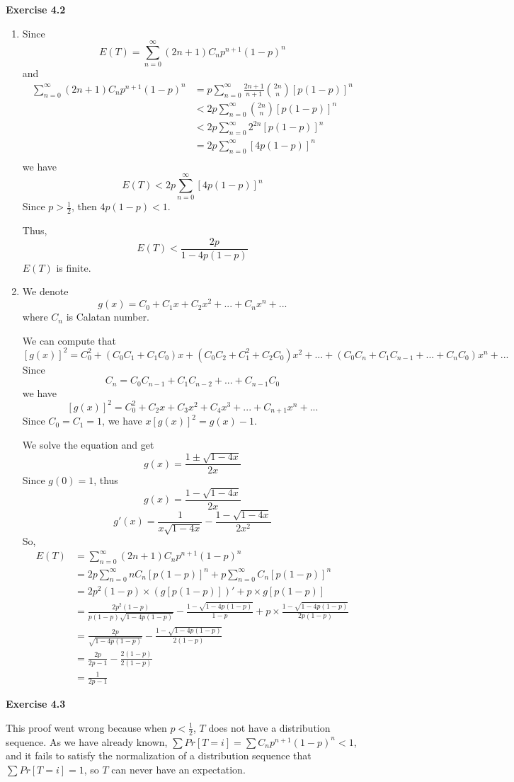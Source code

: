 \documentclass{article} %
\begin{document}
	\textbf{Exercise 4.2}\par
	\begin{enumerate}
	\item Since $$E(T)=\sum_{n=0}^\infty (2n+1)C_{n}p^{n+1}(1-p)^{n}$$
	and
	\begin{align*}
	\sum_{n=0}^\infty (2n+1)C_{n}p^{n+1}(1-p)^{n}&=p\sum_{n=0}^\infty \frac{2n+1}{n+1} \binom{2n}{n}[p(1-p)]^{n}\\
	&<2p\sum_{n=0}^\infty \binom{2n}{n}[p(1-p)]^{n}\\
	&<2p\sum_{n=0}^\infty 2^{2n}[p(1-p)]^{n}\\
	&=2p\sum_{n=0}^\infty [4p(1-p)]^{n}\\
	\end{align*}
	we have $$E(T)<2p\sum_{n=0}^\infty [4p(1-p)]^{n}$$
	Since $p>\frac{1}{2}$, then $4p(1-p)<1$.\par
	Thus, $$E(T)<\frac{2p}{1-4p(1-p)}$$ $E(T)$ is finite.
	\item We denote $$g(x)=C_0+C_1x+C_2x^2+...+C_{n}x^{n}+...$$ where $C_{n}$ is Calatan number.\par
	We can compute that $$[g(x)]^2=C_0^2+(C_0C_1+C_1C_0)x+(C_0C_2+C_1^2+C_2C_0)x^2+...+(C_0C_{n}+C_1C_{n-1}+...+C_{n}C_0)x^{n}+...$$
	Since $$C_{n}=C_0C_{n-1}+C_1C_{n-2}+...+C_{n-1}C_0$$
	we have $$[g(x)]^2=C_0^2+C_2x+C_3x^2+C_4x^3+...+C_{n+1}x^{n}+...$$
	Since $C_0=C_1=1$, we have $x[g(x)]^2=g(x)-1$.\par
	We solve the equation and get
	$$g(x)=\frac{1\pm\sqrt{1-4x}}{2x}$$
	Since $g(0)=1$, thus 
	$$g(x)=\frac{1-\sqrt{1-4x}}{2x}$$
	$$g'(x)=\frac{1}{x\sqrt{1-4x}}-\frac{1-\sqrt{1-4x}}{2x^2}$$
	So,
	\begin{align*}
	E(T)&=\sum_{n=0}^\infty (2n+1)C_{n}p^{n+1}(1-p)^{n}\\
	&=2p\sum_{n=0}^\infty nC_{n}[p(1-p)]^{n}+p\sum_{n=0}^\infty C_{n}[p(1-p)]^{n}\\
	&=2p^2(1-p)\times (g[p(1-p)])'+p\times g[p(1-p)]\\
	&=\frac{2p^2(1-p)}{p(1-p)\sqrt{1-4p(1-p)}}-\frac{1-\sqrt{1-4p(1-p)}}{1-p}+p\times \frac{1-\sqrt{1-4p(1-p)}}{2p(1-p)}\\
	&=\frac{2p}{\sqrt{1-4p(1-p)}}-\frac{1-\sqrt{1-4p(1-p)}}{2(1-p)}\\
	&=\frac{2p}{2p-1}-\frac{2(1-p)}{2(1-p)}\\
	&=\frac{1}{2p-1}
	\end{align*}
	\end{enumerate}


	\textbf{Exercise 4.3}\par
	This proof went wrong because when $p<\frac{1}{2}$, $T$ does not have a distribution sequence. As we have already known, $\sum Pr[T=i]=\sum C_n p^{n+1}(1-p)^n<1$, and it fails to satisfy the normalization of a distribution sequence that $\sum Pr[T=i]=1$, so $T$ can never have an expectation.
	
\end{document}
